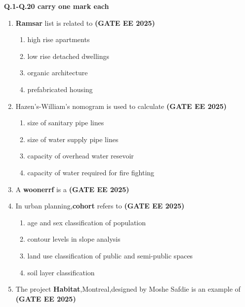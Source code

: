 \documentclass[journal,12pt,onecolumn]{IEEEtran}
\theoremstyle{remark}
\begin{document}
\begin{center}
\textbf{Q.1-Q.20 carry one mark each}
\end{center}
\begin{enumerate}
\item
\textbf{Ramsar} list is related to  \hfill \textbf{(GATE EE 2025)}
       \begin{enumerate} 
   \item  high rise apartments
    \item low rise detached dwellings
    \item organic architecture
    \item prefabricated housing
\end{enumerate}
\item 
Hazen's-William's nomogram is used to calculate  \hfill \textbf{(GATE EE 2025)}
\begin{enumerate}
    \item size of sanitary pipe lines
    \item size of water supply pipe lines
    \item capacity of overhead water resevoir
    \item capacity of water required for fire fighting
\end{enumerate}
\item A \textbf{woonerrf} is a  \hfill \textbf{(GATE EE 2025)}
\begin{enumerate}
\end{enumerate}
\item In urban planning,\textbf{cohort} refers to  \hfill \textbf{(GATE EE 2025)}
\begin{enumerate}
    \item age and sex classification of population
    \item contour levels in slope analysis
    \item land use classification of public and semi-public spaces
    \item soil layer classification
\end{enumerate}
\item The project \textbf{Habitat},Montreal,designed by Moshe Safdie is an example of \hfill \textbf{(GATE EE 2025)}

\end{enumerate}
\end{document}
